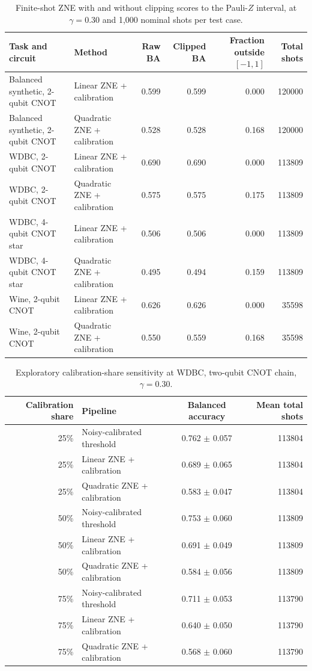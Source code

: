 \documentclass[10pt]{article}
\begin{document}
\begin{table}[t]\centering\scriptsize
\caption{Finite-shot ZNE with and without clipping scores to the Pauli-$Z$ interval, at $\gamma=0.30$ and 1,000 nominal shots per test case.}
\label{tab:zne_range}
\begin{tabular}{@{}l l r r r r@{}}\toprule
Task and circuit & Method & Raw BA & Clipped BA & Fraction outside $[-1,1]$ & Total shots \\
\midrule
Balanced synthetic, 2-qubit CNOT & Linear ZNE + calibration & 0.599 & 0.599 & 0.000 & 120000 \\
Balanced synthetic, 2-qubit CNOT & Quadratic ZNE + calibration & 0.528 & 0.528 & 0.168 & 120000 \\
WDBC, 2-qubit CNOT & Linear ZNE + calibration & 0.690 & 0.690 & 0.000 & 113809 \\
WDBC, 2-qubit CNOT & Quadratic ZNE + calibration & 0.575 & 0.575 & 0.175 & 113809 \\
WDBC, 4-qubit CNOT star & Linear ZNE + calibration & 0.506 & 0.506 & 0.000 & 113809 \\
WDBC, 4-qubit CNOT star & Quadratic ZNE + calibration & 0.495 & 0.494 & 0.159 & 113809 \\
Wine, 2-qubit CNOT & Linear ZNE + calibration & 0.626 & 0.626 & 0.000 & 35598 \\
Wine, 2-qubit CNOT & Quadratic ZNE + calibration & 0.550 & 0.559 & 0.168 & 35598 \\
\bottomrule\end{tabular}\end{table}

\begin{table}[t]\centering\scriptsize
\caption{Exploratory calibration-share sensitivity at WDBC, two-qubit CNOT chain, $\gamma=0.30$.}
\label{tab:allocation}
\begin{tabular}{@{}r l c r@{}}\toprule
Calibration share & Pipeline & Balanced accuracy & Mean total shots \\
\midrule
25\% & Noisy-calibrated threshold & 0.762 $\pm$ 0.057 & 113804 \\
25\% & Linear ZNE + calibration & 0.689 $\pm$ 0.065 & 113804 \\
25\% & Quadratic ZNE + calibration & 0.583 $\pm$ 0.047 & 113804 \\
50\% & Noisy-calibrated threshold & 0.753 $\pm$ 0.060 & 113809 \\
50\% & Linear ZNE + calibration & 0.691 $\pm$ 0.049 & 113809 \\
50\% & Quadratic ZNE + calibration & 0.584 $\pm$ 0.056 & 113809 \\
75\% & Noisy-calibrated threshold & 0.711 $\pm$ 0.053 & 113790 \\
75\% & Linear ZNE + calibration & 0.640 $\pm$ 0.050 & 113790 \\
75\% & Quadratic ZNE + calibration & 0.568 $\pm$ 0.060 & 113790 \\
\bottomrule\end{tabular}\end{table}
\end{document}
